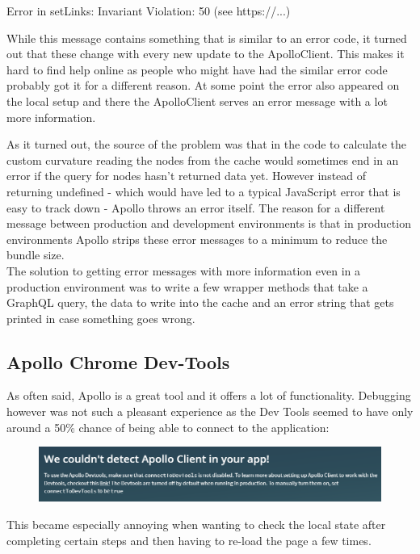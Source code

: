 \centerline{Error in setLinks: Invariant Violation: 50 (see https://...)} 

While this message contains something that is similar to an error code, it turned out that these change with every new update to the ApolloClient. This makes it hard to find help online as people who might have had the similar error code probably got it for a different reason. At some point the error also appeared on the local setup and there the ApolloClient serves an error message with a lot more information. 

As it turned out, the source of the problem was that in the code to calculate the custom curvature reading the nodes from the cache would sometimes end in an error if the query for nodes hasn't returned data yet. However instead of returning undefined - which would have led to a typical JavaScript error that is easy to track down - Apollo throws an error itself. The reason for a different message between production and development environments is that in production environments Apollo strips these error messages to a minimum to reduce the bundle size. \\

The solution to getting error messages with more information even in a production environment was to write a few wrapper methods that take a GraphQL query, the data to write into the cache and an error string that gets printed in case something goes wrong.

\subsection{Apollo Chrome Dev-Tools}
As often said, Apollo is a great tool and it offers a lot of functionality. Debugging however was not such a pleasant experience as the Dev Tools seemed to have only around a 50\% chance of being able to connect to the application:
\begin{figure}[H]
\centering
\includegraphics[scale=.65]{Bilder/ScreenOfDeath.png}
\end{figure}
This became especially annoying when wanting to check the local state after completing certain steps and then having to re-load the page a few times.

